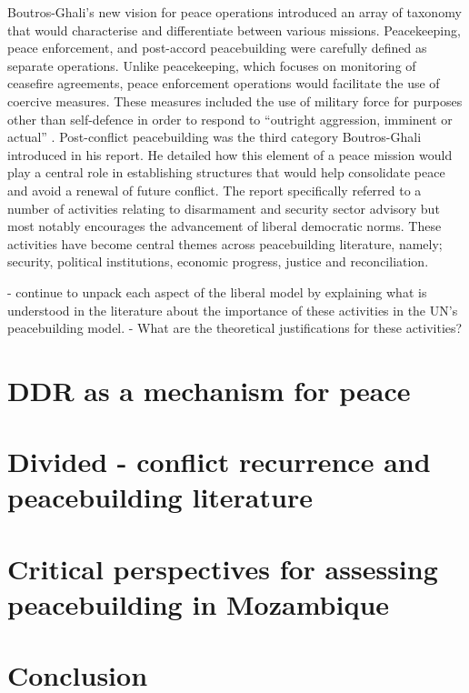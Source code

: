 Boutros-Ghali's new vision for peace operations introduced an array of taxonomy that would characterise and differentiate between various missions. Peacekeeping, peace enforcement, and post-accord peacebuilding were carefully defined as separate operations. Unlike peacekeeping, which focuses on monitoring of ceasefire agreements, peace enforcement operations would facilitate the use of coercive measures. These measures included the use of military force for purposes other than self-defence in order to respond to ``outright aggression, imminent or actual'' \citep[44]{ghali1992}. Post-conflict peacebuilding was the third category Boutros-Ghali introduced in his report. He detailed how this element of a peace mission would play a central role in establishing structures that would help consolidate peace and avoid a renewal of future conflict. The report specifically referred to a number of activities relating to disarmament and security sector advisory but most notably encourages the advancement of liberal democratic norms. These activities have become central themes across peacebuilding literature, namely; security, political institutions, economic progress, justice and reconciliation. 

- continue to unpack each aspect of the liberal model by explaining what is understood in the literature about the importance of these activities in the UN's peacebuilding model. 
- What are the theoretical justifications for these activities?





\section{DDR as a mechanism for peace}





\section{Divided - conflict recurrence and peacebuilding literature}





\section{Critical perspectives for assessing peacebuilding in Mozambique}





\section{Conclusion}